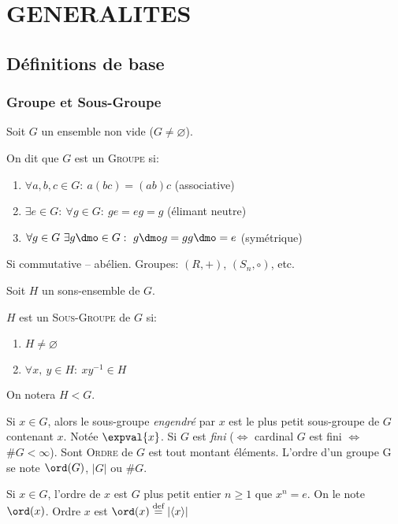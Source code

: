\chapter{GENERALITES} %
\label{cha:generalites}

\section{Définitions de base}
\subsection{Groupe et Sous-Groupe} %
\label{sub:groupe_et_sous_groupe}

Soit $G$ un ensemble non vide ($G\neq\varnothing$).
\begin{definition}
	On dit que $G$ est un \textsc{Groupe} si:
	\begin{enumerate}
		\item $\forall a,b,c\in G:\ a(bc)=(ab)c$ (associative)
		\item $\exists e\in G:\ \forall g\in G:\ ge=eg=g$ (élimant neutre)
		\item $\forall g\in G\ \exists g\dmo \in G:\ g\dmo g=gg\dmo=e$ (symétrique)
	\end{enumerate}
\end{definition}

Si commutative -- abélien. Groupes: $(R, +)$, $(S_n, \circ)$, etc.

Soit $H$ un sons-ensemble de $G$.
\begin{definition}
	$H$ est un \textsc{Sous-Groupe} de $G$ si:
	\begin{enumerate}
		\item $H\neq\varnothing$
		\item $\forall x,\ y \in H:\ xy^{-1}\in H$
	\end{enumerate}
	On notera $H < G$.
\end{definition}

Si $x\in G$, alors le sous-groupe \emph{engendré} par $x$ est le plus petit sous-groupe de $G$ contenant $x$. Notée $\expval{x}$. Si $G$ est \emph{fini} ($\Leftrightarrow$ cardinal $G$ est fini $\Leftrightarrow$ $\#G<\infty$). Sont \textsc{Ordre} de $G$ est tout montant éléments. L'ordre d'un groupe G se note $\ord(G)$, $|G|$ ou $\#G$.

Si  $x\in G$, l'ordre de $x$ est $G$ plus petit entier $n\geq 1$ que $x^n = e$. On le note $\ord(x)$. Ordre $x$ est $\ord(x)\overset{\text{def}}{=}|\langle x\rangle|$


